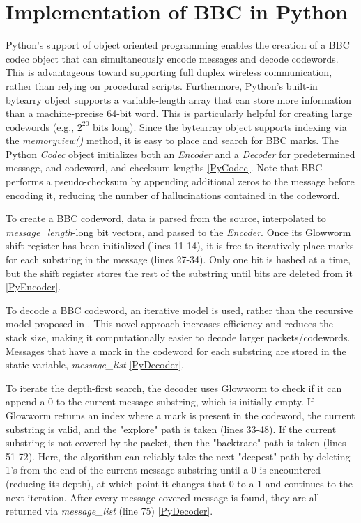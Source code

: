 \documentclass[conference]{IEEEtran}
\begin{document}
\section{Implementation of BBC in Python}
Python’s support of object oriented programming enables the creation of a BBC codec object that can simultaneously encode messages and decode codewords. This is advantageous toward supporting full duplex wireless communication, rather than relying on procedural scripts. Furthermore, Python’s built-in bytearry object supports a variable-length array that can store more information than a machine-precise 64-bit word. This is particularly helpful for creating large codewords (e.g., $2^{20}$ bits long). Since the bytearray object supports indexing via the \textit{memoryview()} method, it is easy to place and search for BBC marks. The Python \textit{Codec} object initializes both an \textit{Encoder} and a \textit{Decoder} for predetermined message, and codeword, and checksum lengths \ref{PyCodec}. Note that BBC performs a pseudo-checksum by appending additional zeros to the message before encoding it, reducing the number of hallucinations contained in the codeword.

To create a BBC codeword, data is parsed from the source, interpolated to \textit{message\_length}-long bit vectors, and passed to the \textit{Encoder}. Once its Glowworm shift register has been initialized (lines 11-14), it is free to iteratively place marks for each substring in the message (lines 27-34). Only one bit is hashed at a time, but the shift register stores the rest of the substring until bits are deleted from it \ref{PyEncoder}.

To decode a BBC codeword, an iterative model is used, rather than the recursive model proposed in \cite{thesis}. This novel approach increases efficiency and reduces the stack size, making it computationally easier to decode larger packets/codewords. Messages that have a mark in the codeword for each substring are stored in the static variable, \textit{message\_list} \ref{PyDecoder}.

To iterate the depth-first search, the decoder uses Glowworm to check if it can append a 0 to the current message substring, which is initially empty. If Glowworm returns an index where a mark is present in the codeword, the current substring is valid, and the "explore" path is taken (lines 33-48). If the current substring is not covered by the packet, then the "backtrace" path is taken (lines 51-72). Here, the algorithm can reliably take the next "deepest" path by deleting 1's from the end of the current message substring until a 0 is encountered (reducing its depth), at which point it changes that 0 to a 1 and continues to the next iteration. After every message covered message is found, they are all returned via \textit{message\_list} (line 75) \ref{PyDecoder}.
\end{document}
